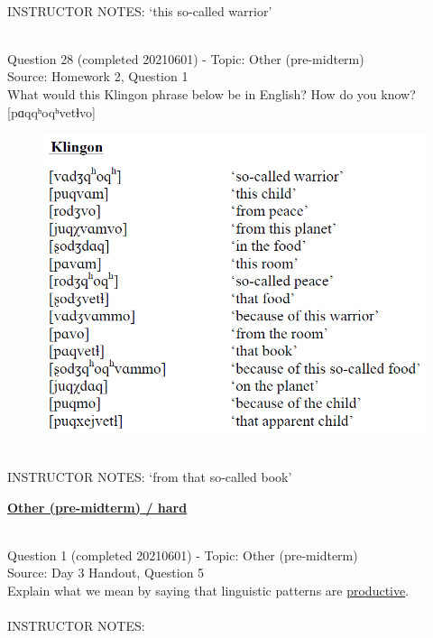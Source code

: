 \documentclass[12pt]{article}
\begin{document}
~\\
INSTRUCTOR NOTES: ‘this so-called warrior’


~\\

{\large Question 28} (completed 20210601) - Topic: Other (pre-midterm)\\
Source: Homework 2, Question 1\\

What would this Klingon phrase below be in English? How do you know?\\

{[pɑqqʰoqʰvetɬvo]}

\begin{figure}[H]
\includegraphics{../images/klingon.png}
\end{figure}

~\\
INSTRUCTOR NOTES: ‘from that so-called book’


\newpage\textbf{\underline{\huge Other (pre-midterm) / hard\\}}

~\\

{\large Question 1} (completed 20210601) - Topic: Other (pre-midterm)\\
Source: Day 3 Handout, Question 5\\

Explain what we mean by saying that linguistic patterns are \underline{productive}.\\


~\\
INSTRUCTOR NOTES: 
\end{document}
